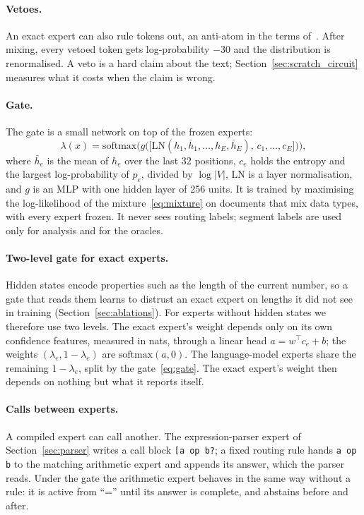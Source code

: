 \documentclass[10pt]{article}
\begin{document}
\paragraph{Vetoes.} An exact expert can also rule tokens out, an anti-atom in the terms
of~\citet{mossaiby_roas}. After mixing, every vetoed token gets log-probability $-30$ and the
distribution is renormalised. A veto is a hard claim about the text; Section~\ref{sec:scratch_circuit}
measures what it costs when the claim is wrong.

\paragraph{Gate.} The gate is a small network on top of the frozen experts:
\begin{equation}
\lambda(x) = \mathrm{softmax}\Big(g\big(\big[\mathrm{LN}(h_1,\bar h_1,\dots,h_E,\bar h_E),\,
c_1,\dots,c_E\big]\big)\Big),
\label{eq:gate}
\end{equation}
where $\bar h_e$ is the mean of $h_e$ over the last 32 positions, $c_e$ holds the entropy and
the largest log-probability of $p_e$, divided by $\log|V|$, LN is a layer normalisation, and $g$
is an MLP with one hidden layer of 256 units. It is trained by maximising the log-likelihood of
the mixture~\eqref{eq:mixture} on documents that mix data types, with every expert frozen. It
never sees routing labels; segment labels are used only for analysis and for the oracles.

\paragraph{Two-level gate for exact experts.} Hidden states encode properties such as the
length of the current number, so a gate that reads them learns to distrust an exact expert on
lengths it did not see in training (Section~\ref{sec:ablations}). For experts without hidden
states we therefore use two levels. The exact expert's weight depends only on its own
confidence features, measured in nats, through a linear head $a = w^\top c_e + b$; the weights
$(\lambda_e, 1-\lambda_e)$ are $\mathrm{softmax}(a, 0)$. The language-model experts share the
remaining $1-\lambda_e$, split by the gate~\eqref{eq:gate}. The exact expert's weight then
depends on nothing but what it reports itself.

\paragraph{Calls between experts.} A compiled expert can call another. The expression-parser
expert of Section~\ref{sec:parser} writes a call block \texttt{[a op b?}; a fixed routing rule
hands \texttt{a op b} to the matching arithmetic expert and appends its answer, which the parser
reads. Under the gate the arithmetic expert behaves in the same way without a rule: it is
active from ``='' until its answer is complete, and abstains before and after.
\end{document}
